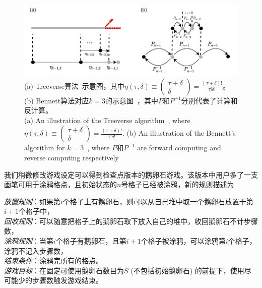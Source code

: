 \documentclass[A4,twoside,UTF8]{ctexart}
\begin{document}
\begin{figure}
    \centerline{\includegraphics[width=0.88\columnwidth,trim={0 0cm 0 0cm},clip]{tradeoff2.pdf}}
    \caption{
        (a) Treeverse算法~\cite{Griewank1992}示意图，其中$\eta(\tau, \delta) \equiv \left(\begin{matrix} \tau + \delta \\ \delta \end{matrix}\right)=\frac{(\tau+\delta)!}{\tau!\delta!}$。(b) Bennett算法对应$k=3$的示意图~\cite{Bennett1973,Levine1990}，其中$P$和$P^{-1}$分别代表了计算和反计算。\\
        (a) An illustration of the Treeverse algorithm~\cite{Griewank1992}, where $\eta(\tau, \delta) \equiv \left(\begin{matrix} \tau + \delta \\ \delta \end{matrix}\right)=\frac{(\tau+\delta)!}{\tau!\delta!}$.
        (b) An illustration of the Bennett's algorithm for $k=3$~\cite{Bennett1973,Levine1990}, where $P$和$P^{-1}$ are forward computing and reverse computing respectively\\
        }\label{fig:tradeoff}
\end{figure}


我们稍微修改游戏设定可以得到检查点版本的鹅卵石游戏。该版本中用户多了一支画笔可用于涂鸦格点，且初始状态的$n$号格子已经被涂鸦，新的规则描述为
\begin{tcolorbox}[width=\textwidth, title=鹅卵石游戏-检查点版本]
    \textit{放置规则}：如果第$i$个格子上有鹅卵石，则可以从自己堆中取一个鹅卵石放置于第$i+1$个格子中，\\
    \textit{回收规则}：可以随意把格子上的鹅卵石取下放入自己的堆中，收回鹅卵石不计步骤数，\\
    \textit{涂鸦规则}：当第$i$个格子有鹅卵石，且第$i+1$个格子被涂鸦，可以涂鸦第$i$个格子，涂鸦不记入步骤数，\\
    \textit{结束条件}：涂鸦完所有的格点。\\
    \textit{游戏目标}：在固定可使用鹅卵石数目为$S$ (不包括初始鹅卵石) 的前提下，使用尽可能少的步骤数触发游戏结束。
\end{tcolorbox}
\end{document}
